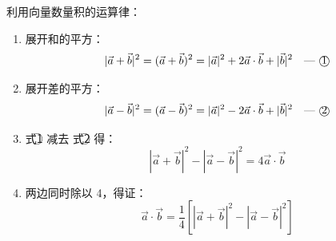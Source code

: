 \begin{proofbox}
利用向量数量积的运算律：
\begin{enumerate}
    \item 展开和的平方：
    \[ |\vec{a} + \vec{b}|^2 = (\vec{a} + \vec{b})^2 = |\vec{a}|^2 + 2\vec{a} \cdot \vec{b} + |\vec{b}|^2 \quad \text{--- \textcircled{1}} \]
    \item 展开差的平方：
    \[ |\vec{a} - \vec{b}|^2 = (\vec{a} - \vec{b})^2 = |\vec{a}|^2 - 2\vec{a} \cdot \vec{b} + |\vec{b}|^2 \quad \text{--- \textcircled{2}} \]
    \item 式\textcircled{1} 减去 式\textcircled{2} 得：
    \[ |\vec{a} + \vec{b}|^2 - |\vec{a} - \vec{b}|^2 = 4\vec{a} \cdot \vec{b} \]
    \item 两边同时除以 4，得证：
    \[ \vec{a} \cdot \vec{b} = \frac{1}{4} \left[ |\vec{a} + \vec{b}|^2 - |\vec{a} - \vec{b}|^2 \right] \]
\end{enumerate}
\end{proofbox}